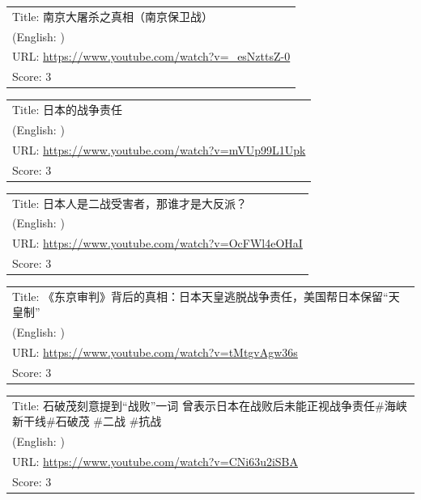 \documentclass{article}
\begin{document}
\noindent
\begin{tabular}{p{}}
Title: 南京大屠杀之真相（南京保卫战） \\
(English: ) \\
URL: \url{https://www.youtube.com/watch?v=_esNzttsZ-0} \\
Score: 3 \\
\end{tabular}
\vspace{0.5em}

\noindent
\begin{tabular}{p{}}
Title: 日本的战争责任 \\
(English: ) \\
URL: \url{https://www.youtube.com/watch?v=mVUp99L1Upk} \\
Score: 3 \\
\end{tabular}
\vspace{0.5em}

\noindent
\begin{tabular}{p{}}
Title: 日本人是二战受害者，那谁才是大反派？ \\
(English: ) \\
URL: \url{https://www.youtube.com/watch?v=OcFWl4eOHaI} \\
Score: 3 \\
\end{tabular}
\vspace{0.5em}

\noindent
\begin{tabular}{p{}}
Title: 《东京审判》背后的真相：日本天皇逃脱战争责任，美国帮日本保留“天皇制” \\
(English: ) \\
URL: \url{https://www.youtube.com/watch?v=tMtgvAgw36s} \\
Score: 3 \\
\end{tabular}
\vspace{0.5em}

\noindent
\begin{tabular}{p{}}
Title: 石破茂刻意提到“战败”一词 曾表示日本在战败后未能正视战争责任\#海峡新干线\#石破茂 \#二战 \#抗战 \\
(English: ) \\
URL: \url{https://www.youtube.com/watch?v=CNi63u2iSBA} \\
Score: 3 \\
\end{tabular}
\vspace{0.5em}
\end{document}
